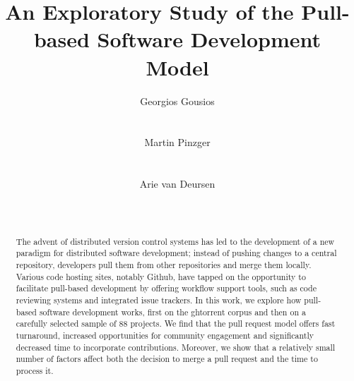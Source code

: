 \documentclass{sig-alternate}
\begin{document}
\newcommand{\todo}[1]{\textbf{TODO}\footnote{\textbf{TODO:} #1}}

\newcommand{\ghtorrent}{ \textsc{ght}orrent\xspace}
\newcommand{\api}{\textsc{api}\xspace}

\title{An Exploratory Study of the Pull-based Software Development Model}

\author{
\alignauthor
Georgios Gousios\\
       \\
       \\
\alignauthor
Martin Pinzger\\
       \\
       \\
\alignauthor
Arie van Deursen\\
       \\
       \\       
}

\maketitle

\begin{abstract}

  The advent of distributed version control systems has led to the development
  of a new paradigm for distributed software development; instead of pushing
  changes to a central repository, developers pull them from other repositories
  and merge them locally. Various code hosting sites, notably Github, have
  tapped on the opportunity to facilitate pull-based development by offering
  workflow support tools, such as code reviewing systems and integrated issue
  trackers. In this work, we explore how pull-based software development works,
  first on the {\sc ght}orrent corpus and then on a carefully selected sample of 88
  projects. We find that the pull request model offers fast turnaround,
  increased opportunities for community engagement and significantly decreased
  time to incorporate contributions. Moreover, we show that a relatively
  small number of factors affect both the decision to merge a pull request and
  the time to process it.

\end{abstract}
\end{document}
